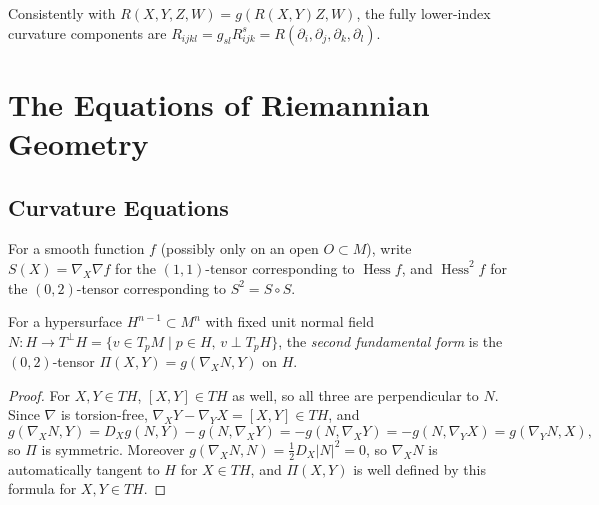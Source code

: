 \begin{remark}
  \label{rem:pet-ch3-curvature-index-conventions}
  \leanok
  Consistently with $R(X,Y,Z,W)=g(R(X,Y)Z,W)$, the fully lower-index curvature
  components are $R_{ijkl}=g_{sl}R^s_{ijk}=R(\partial_i,\partial_j,\partial_k,\partial_l)$.
\end{remark}

\section{The Equations of Riemannian Geometry}

\subsection{Curvature Equations}

\begin{definition}
  \label{def:pet-ch3-hessian-square-notation}
  \leanok
  For a smooth function $f$ (possibly only on an open $O\subset M$), write
  $S(X)=\nabla_X\nabla f$ for the $(1,1)$-tensor corresponding to
  $\operatorname{Hess}f$, and $\operatorname{Hess}^2f$ for the $(0,2)$-tensor
  corresponding to $S^2=S\circ S$.
\end{definition}

\begin{definition}
  \label{def:pet-ch3-second-fundamental-form}
  \leanok
  For a hypersurface $H^{n-1}\subset M^n$ with fixed unit normal field
  $N:H\to T^\perp H=\{v\in T_pM\mid p\in H,\,v\perp T_pH\}$, the \emph{second
  fundamental form} is the $(0,2)$-tensor $\Pi(X,Y)=g(\nabla_XN,Y)$ on $H$.
\end{definition}
\begin{proof}
  \leanok
  For $X,Y\in TH$, $[X,Y]\in TH$ as well, so all three are perpendicular to $N$.
  Since $\nabla$ is torsion-free, $\nabla_XY-\nabla_YX=[X,Y]\in TH$, and
  \[
    g(\nabla_XN,Y)=D_Xg(N,Y)-g(N,\nabla_XY)=-g(N,\nabla_XY)=-g(N,\nabla_YX)=g(\nabla_YN,X),
  \]
  so $\Pi$ is symmetric. Moreover $g(\nabla_XN,N)=\tfrac12D_X|N|^2=0$, so
  $\nabla_XN$ is automatically tangent to $H$ for $X\in TH$, and $\Pi(X,Y)$ is
  well defined by this formula for $X,Y\in TH$.
\end{proof}


